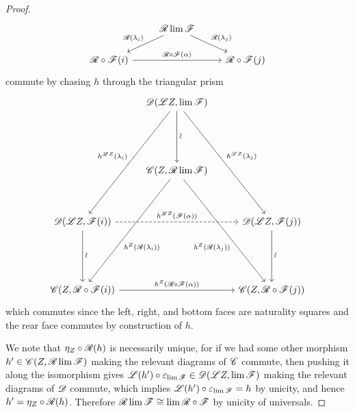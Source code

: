 \documentclass[10pt]{amsart}
\begin{document}
\begin{prop}
\begin{proof}
$$\begin{tikzcd}
    &\RA \lim \F\arrow[swap]{ld}{\RA(\lambda_i)}\arrow{rd}{\RA(\lambda_j)}\\
    \RA \circ \F(i) \arrow{rr}{\RA \circ \F(\alpha)} & & \RA \circ \F(j)
  \end{tikzcd}$$
  commute by chasing $h$ through the triangular prism
  $$\begin{tikzcd}
    & \D(\LA Z, \lim \F) \arrow[swap]{lddddd}{h^{\LA Z}(\lambda_i)}\arrow{rddddd}{h^{\LA Z}(\lambda_j)}\arrow{ddd}[rotate=90,yshift=-1ex,xshift=-1ex]{\sim}\\
    \\
    \\
    & \C(Z, \RA \lim \F)\arrow[crossing over]{lddddd}[pos=0.6]{h^Z(\RA(\lambda_i))}\arrow[crossing over,swap]{rddddd}[pos=0.6]{h^Z(\RA(\lambda_j))}\\
    \\
    \D(\LA Z, \F(i)) \arrow[dashed]{rr}{h^{\LA Z}(\F(\alpha))}\arrow{ddd}[rotate=90,yshift=-1ex,xshift=-1ex]{\sim}& & \D(\LA Z, \F(j))\arrow{ddd}[rotate=90,yshift=-1ex,xshift=-1ex]{\sim}\\
    \\
    \\
    \C(Z, \RA \circ \F(i))\arrow{rr}{h^Z(\RA \circ \F(\alpha))} & & \C(Z, \RA \circ \F(j))
  \end{tikzcd}$$
  which commutes since the left, right, and bottom faces are naturality squares and the rear face commutes by construction of $h$.
  
  We note that $\eta_Z \circ \mathscr{R}(h)$ is necessarily unique, for if we had some other morphism $h^\prime \in \mathscr{C}(Z, \mathscr{R} \lim \mathscr{F})$ making the relevant diagrams of $\mathscr{C}$ commute, then pushing it along the isomorphism gives $\mathscr{L}(h^\prime) \circ \varepsilon_{\lim \mathscr{F}} \in \mathscr{D}(\mathscr{L} Z, \lim \mathscr{F})$ making the relevant diagrams of $\mathscr{D}$ commute, which implies $\mathscr{L}(h^\prime) \circ \varepsilon_{\lim \mathscr{F}} = h$ by unicity, and hence $h^\prime = \eta_Z \circ \mathscr{R}(h)$.
  Therefore $\mathscr{R} \lim \mathscr{F} \cong \lim \mathscr{R} \circ \mathscr{F}$ by unicity of universals.
  \end{proof}
\end{prop}
\end{document}
